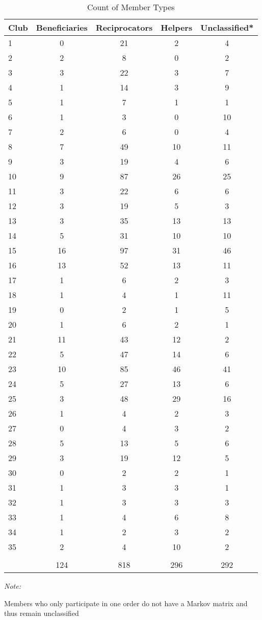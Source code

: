 \documentclass[
]{article}
\begin{document}
\begin{table}

\caption{\label{tab:member types}Count of Member Types}
\centering
\begin{threeparttable}
\begin{tabular}[t]{lcccc}
\toprule
Club & Beneficiaries & Reciprocators & Helpers & Unclassified*\\
\midrule
1 & 0 & 21 & 2 & 4\\
2 & 2 & 8 & 0 & 2\\
3 & 3 & 22 & 3 & 7\\
4 & 1 & 14 & 3 & 9\\
5 & 1 & 7 & 1 & 1\\
6 & 1 & 3 & 0 & 10\\
7 & 2 & 6 & 0 & 4\\
8 & 7 & 49 & 10 & 11\\
9 & 3 & 19 & 4 & 6\\
10 & 9 & 87 & 26 & 25\\
11 & 3 & 22 & 6 & 6\\
12 & 3 & 19 & 5 & 3\\
13 & 3 & 35 & 13 & 13\\
14 & 5 & 31 & 10 & 10\\
15 & 16 & 97 & 31 & 46\\
16 & 13 & 52 & 13 & 11\\
17 & 1 & 6 & 2 & 3\\
18 & 1 & 4 & 1 & 11\\
19 & 0 & 2 & 1 & 5\\
20 & 1 & 6 & 2 & 1\\
21 & 11 & 43 & 12 & 2\\
22 & 5 & 47 & 14 & 6\\
23 & 10 & 85 & 46 & 41\\
24 & 5 & 27 & 13 & 6\\
25 & 3 & 48 & 29 & 16\\
26 & 1 & 4 & 2 & 3\\
27 & 0 & 4 & 3 & 2\\
28 & 5 & 13 & 5 & 6\\
29 & 3 & 19 & 12 & 5\\
30 & 0 & 2 & 2 & 1\\
31 & 1 & 3 & 3 & 1\\
32 & 1 & 3 & 3 & 3\\
33 & 1 & 4 & 6 & 8\\
34 & 1 & 2 & 3 & 2\\
35 & 2 & 4 & 10 & 2\\
\addlinespace[0.3em]
\multicolumn{5}{l}{\textbf{Totals}}\\
\hspace{1em} & 124 & 818 & 296 & 292\\
\bottomrule
\end{tabular}
\begin{tablenotes}
\item \textit{Note: } 
\item * Members who only participate in one order do not have a Markov matrix and thus remain unclassified
\end{tablenotes}
\end{threeparttable}
\end{table}
\end{document}

